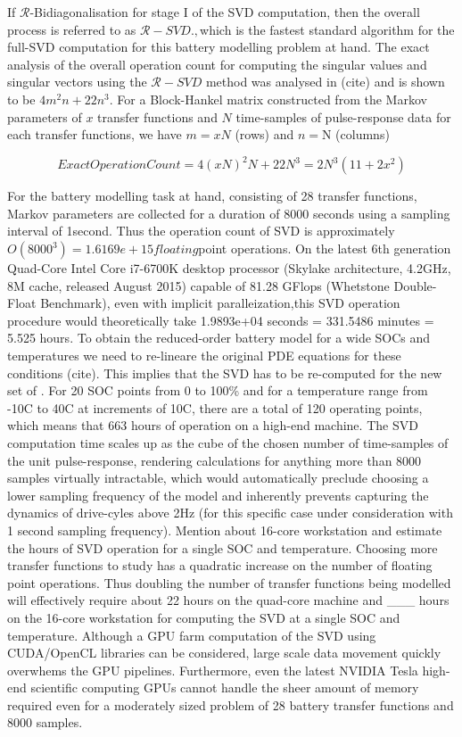 If $\mathcal{R}$-Bidiagonalisation for stage I  of the SVD computation, then the
overall  process  is referred  to  as  $\mathcal{R}-SVD.,$which is  the  fastest
standard  algorithm for  the  full-SVD computation  for  this battery  modelling
problem at hand. The exact analysis of the overall operation count for computing
the singular values and singular  vectors using the $\mathcal{R}-SVD$ method was
analysed in  (cite) and  is shown  to be  $4m^{2}n+22n^{3}$. For  a Block-Hankel
matrix constructed from the Markov parameters  of $x$ transfer functions and $N$
time-samples of pulse-response data for  each transfer functions, we have $m=xN$
(rows) and $n=$N (columns)

\[
ExactOperationCount=4(xN)^{2}N+22N^{3}=2N^{3}(11+2x^{2})
\]

For the  battery modelling task  at hand,  consisting of 28  transfer functions,
Markov  parameters  are  collected  for  a duration  of  8000  seconds  using  a
sampling interval of  1second. Thus the operation count of  SVD is approximately
$O(8000^{3})=1.6169e+15floating$point operations.  On the latest  6th generation
Quad-Core Intel  Core i7-6700K desktop processor  (Skylake architecture, 4.2GHz,
8M cache, released August 2015)  capable of 81.28 GFlops (Whetstone Double-Float
Benchmark), even with implicit paralleization,this SVD operation procedure would
theoretically  take 1.9893e+04  seconds =  331.5486  minutes =  5.525 hours.  To
obtain the reduced-order battery model for  a wide SOCs and temperatures we need
to  re-lineare the  original PDE  equations  for these  conditions (cite).  This
implies that  the SVD  has to be  re-computed for the  new set  of . For  20 SOC
points  from 0  to  100\%  and for  a  temperature range  from  -10C  to 40C  at
increments of 10C, there  are a total of 120 operating  points, which means that
663  hours  of  operation  on  a high-end  machine.  The  SVD  computation  time
scales  up  as the  cube  of  the chosen  number  of  time-samples of  the  unit
pulse-response,  rendering  calculations for  anything  more  than 8000  samples
virtually  intractable,  which would  automatically  preclude  choosing a  lower
sampling frequency of  the model and inherently prevents  capturing the dynamics
of drive-cyles  above 2Hz  (for this  specific case  under consideration  with 1
second sampling frequency).  Mention about 16-core workstation  and estimate the
hours of SVD operation for a  single SOC and temperature. Choosing more transfer
functions to  study has  a quadratic  increase on the  number of  floating point
operations. Thus doubling  the number of transfer functions  being modelled will
effectively require about 22 hours on  the quad-core machine and \_\_\_ hours on
the 16-core workstation  for computing the SVD at a  single SOC and temperature.
Although a  GPU farm computation of  the SVD using CUDA/OpenCL  libraries can be
considered,  large scale  data  movement quickly  overwhems  the GPU  pipelines.
Furthermore, even  the latest  NVIDIA Tesla  high-end scientific  computing GPUs
cannot handle  the sheer amount of  memory required even for  a moderately sized
problem of 28 battery transfer functions and 8000 samples.

